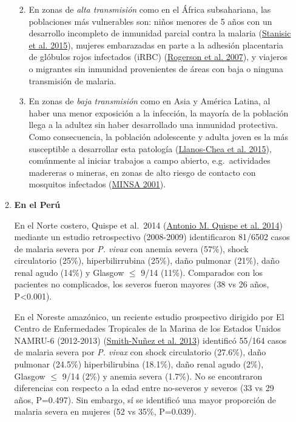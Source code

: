 \documentclass[
  a4paper]{article}
\providecommand{\tightlist}{%
  \setlength{\itemsep}{0pt}\setlength{\parskip}{0pt}}
\begin{document}
\begin{enumerate}
\begin{enumerate}
    \begin{enumerate}
    \def\labelenumiii{\arabic{enumiii}.}
    \tightlist
    \item
      En zonas de \emph{alta transmisión} como en el África
      subsahariana, las poblaciones más vulnerables son: niños menores
      de 5 años con un desarrollo incompleto de inmunidad parcial contra
      la malaria (\protect\hyperlink{ref-Stanisic2015}{Stanisic et al.
      2015}), mujeres embarazadas en parte a la adhesión placentaria de
      glóbulos rojos infectados (iRBC)
      (\protect\hyperlink{ref-rogerson2007preg}{Rogerson et al. 2007}),
      y viajeros o migrantes sin inmunidad provenientes de áreas con
      baja o ninguna transmisión de malaria.
    \item
      En zonas de \emph{baja transmisión} como en Asia y América Latina,
      al haber una menor exposición a la infección, la mayoría de la
      población llega a la adultez sin haber desarrollado una inmunidad
      protectiva. Como consecuencia, la población adolescente y adulta
      joven es la más susceptible a desarrollar esta patología
      (\protect\hyperlink{ref-llanoschea2015}{Llanos-Chea et al. 2015}),
      comúnmente al iniciar trabajos a campo abierto, e.g.~actividades
      madereras o mineras, en zonas de alto riesgo de contacto con
      mosquitos infectados (\protect\hyperlink{ref-factores2001}{MINSA
      2001}).
    \end{enumerate}
  \item
    \textbf{En el Perú}

    En el Norte costero, Quispe et al.~2014
    (\protect\hyperlink{ref-quispe2014}{Antonio M. Quispe et al. 2014})
    mediante un estudio retrospectivo (2008-2009) identificaron 81/6502
    casos de malaria severa por \emph{P. vivax} con anemia severa
    (57\%), shock circulatorio (25\%), hiperbilirrubina (25\%), daño
    pulmonar (21\%), daño renal agudo (14\%) y Glasgow \(\le\) 9/14
    (11\%). Comparados con los pacientes no complicados, los severos
    fueron mayores (38 vs 26 años, P\textless0.001).

    En el Noreste amazónico, un reciente estudio prospectivo dirigido
    por El Centro de Enfermedades Tropicales de la Marina de los Estados
    Unidos NAMRU-6 (2012-2013)
    (\protect\hyperlink{ref-smith2013}{Smith-Nuñez et al. 2013})
    identificó 55/164 casos de malaria severa por \emph{P. vivax} con
    shock circulatorio (27.6\%), daño pulmonar (24.5\%) hiperbilirubina
    (18.1\%), daño renal agudo (2\%), Glasgow \(\le\) 9/14 (2\%) y
    anemia severa (1.7\%). No se encontraron diferencias con respecto a
    la edad entre no-severos y severos (33 vs 29 años, P=0.497). Sin
    embargo, sí se identificó una mayor proporción de malaria severa en
    mujeres (52 vs 35\%, P=0.039).
  \end{enumerate}
\end{enumerate}
\end{document}
